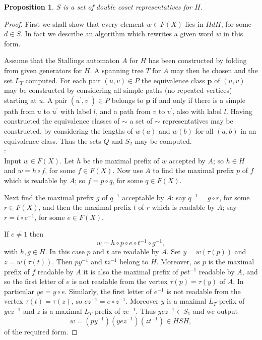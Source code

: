 \documentclass[a4paper,12pt]{article}
\renewcommand{\t}{\tau }
\newcommand{\pp}{\mathbf{p}}
\newtheorem{proposition}[theorem]{Proposition}
\numberwithin{equation}{section}
\numberwithin{figure}{section}
\begin{document}
\begin{proposition}\label{prop:dcreps}
$S$ is a set of double coset representatives for $H$.
\end{proposition}   
\begin{proof}
First we shall show that every element $w\in F(X)$ lies in $HdH$, for some $d\in S$. 
In fact we describe an algorithm which rewrites a given word $w$ in this form. 

Assume that the Stallings automaton $A$ for $H$ has been constructed by folding from
given generators for $H$. A spanning tree $T$ 
for $A$ may then be chosen and the 
set $L_T$ computed. For each pair $(u,v)\in P$ the equivalence class $\pp$ of 
$(u,v)$ may be constructed by considering all simple paths (no repeated vertices)
starting at $u$. A pair $(u^\prime ,v^\prime) \in P$ belongs to $\pp$ 
if and only
if there is a simple path from $u$ to $u^\prime$ with label $l$,
and a path from $v$ to $v^\prime$, also with label $l$. 
Having constructed the equivalence classes of $\sim$
 a set of $\sim$ representatives may be constructed, by considering the 
lengths of $w(a)$ and $w(b)$ for all $(a,b)$ in an equivalence class. Thus the
sets $Q$ and $S_2$ may be computed.   \\

:\\
Input $w\in F(X)$. 
Let $h$ be the maximal prefix of $w$ accepted by $A$; so $h\in H$ and 
$w=h\circ f$, for some $f\in F(X)$. Now use $A$ to find the maximal prefix $p$ 
of $f$ which is readable by $A$; 
 so $f= p\circ q$, for some $q\in F(X)$. 

Next find the maximal prefix $g$ of $q^{-1}$ acceptable by $A$: say 
$q^{-1}=g\circ r$, for some $r\in F(X)$, and then the maximal prefix 
$t$ of $r$ which
is readable by $A$; say $r=t\circ e^{-1}$, for some $e\in F(X)$. 

If $e\neq 1$ then
\[w=h\circ p \circ e\circ t^{-1}\circ g^{-1},\]
with $h,g\in H$. In this case $p$ and $t$ are readable by $A$. Set $y=w(\t(p))$
and $z=w(\t(t))$. Then $py^{-1}$ and $tz^{-1}$ belong to $H$. Moreover, as $p$
is the maximal prefix of $f$ readable by $A$  it is also the maximal 
prefix of $pet^{-1}$ readable by $A$,  and so
  the 
first letter of $e$ is not readable from the vertex $\t(p)=\t(y)$ of $A$. 
In particular
$ye=y\circ e$. Similarly, the first letter of $e^{-1}$ is not readable from
the vertex $\t(t)=\t(z)$, so $ez^{-1}=e\circ z^{-1}$. Moreover $y$ is a 
maximal $L_T$-prefix of $yez^{-1}$ and $z$ is a maximal $L_T$-prefix of $ze^{-1}$. 
Thus $yez^{-1}\in S_1$ and we output
\[w=(py^{-1}) (yez^{-1})(zt^{-1})\in HSH,\]
of the required form.


\end{proof}
\end{document}

